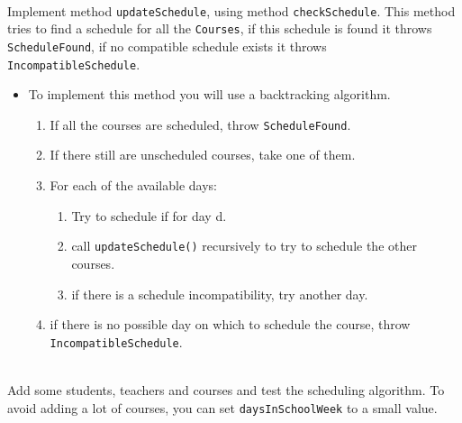 \documentclass{exercices}
\begin{document}
\begin{exercice}\\
Implement method \verb!updateSchedule!, using method \verb!checkSchedule!.
This method tries to find a schedule for all the \verb!Courses!, if this schedule is found it throws
\verb!ScheduleFound!, if no compatible schedule exists it throws \verb!IncompatibleSchedule!.

\begin{itemize}
\item To implement this method you will use a backtracking algorithm. 
\begin{enumerate}
  \item If all the courses are scheduled, throw \verb!ScheduleFound!.
  \item If there still are unscheduled courses, take one of them.
  \item For each of the available days:
  \begin{enumerate}
    \item Try to schedule if for day d.
    \item call \verb!updateSchedule()! recursively to try to schedule the other courses.
    \item if there is a schedule incompatibility, try another day.
  \end{enumerate}
  \item if there is no possible day on which to schedule the course, throw \verb!IncompatibleSchedule!. 
\end{enumerate}
\end{itemize}
\end{exercice}
\begin{exercice}\\
Add some students, teachers and courses and test the scheduling algorithm. 
To avoid adding a lot of courses, you can set \verb!daysInSchoolWeek! to a small value.
\end{exercice}
\end{document}
